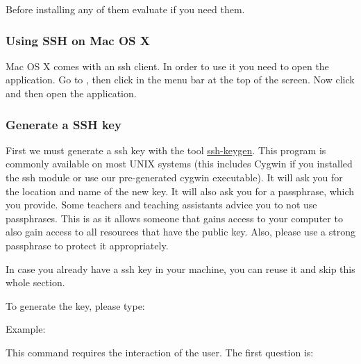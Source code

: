 Before installing any of them evaluate if you need them.


\subsubsection{Using SSH on Mac OS X}
\label{\detokenize{lesson/linux/ssh:using-ssh-on-mac-os-x}}\label{\detokenize{lesson/linux/ssh:s-ssh-osx}}
Mac OS X comes with an ssh client. In order to use it you need to open
the  application. Go to , then click 
in the menu bar at the top of the screen. Now click  and
then open the  application.


\subsubsection{Generate a SSH key}
\label{\detokenize{lesson/linux/ssh:s-ssh-generate}}\label{\detokenize{lesson/linux/ssh:generate-a-ssh-key}}
First we must generate a ssh key with the tool \href{http://linux.die.net/man/1/ssh-keygen}{ssh-keygen}. This program is commonly
available on most UNIX systems (this includes Cygwin if you installed
the ssh module or use our pre-generated cygwin executable). It will
ask you for the location and name of the new key. It will also ask you
for a passphrase, which you  provide. Some teachers and teaching
assistants advice you to not use passphrases. This is  as it
allows someone that gains access to your computer to also gain access to
all resources that have the public key. Also, please use a strong passphrase
to protect it appropriately.

In case you already have a ssh key in your machine, you can reuse it
and skip this whole section.

To generate the key, please type:

Example:

\begin{sphinxVerbatim}[commandchars=\\\{\}]
    
\end{sphinxVerbatim}

This command requires the interaction of the user. The first question is:

\begin{sphinxVerbatim}[commandchars=\\\{\}]
        
\end{sphinxVerbatim}

